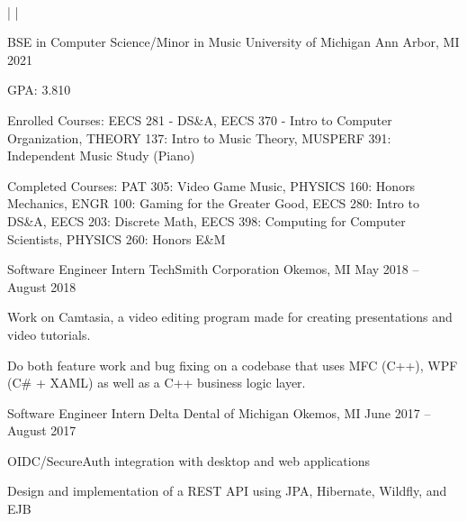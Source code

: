 \documentclass[]{awesome-cv}
\begin{document}
    
\begin{center}
	  \\

	{} | {} | {}
\end{center}
\vspace{-4mm}
\vspace{-2mm}
\cventry
	{BSE in Computer Science/Minor in Music}
	{University of Michigan}
	{Ann Arbor, MI}
	{2021}
	{\begin{cvitems}
		\item{GPA: 3.810}
		\item {Enrolled Courses: EECS 281 - DS\&A, EECS 370 - Intro to Computer Organization, THEORY 137: Intro to Music Theory, MUSPERF 391: Independent Music Study (Piano)}
		\item {Completed Courses: PAT 305: Video Game Music, PHYSICS 160: Honors Mechanics, ENGR 100: Gaming for the Greater Good, EECS 280: Intro to DS\&A, EECS 203: Discrete Math, EECS 398: Computing for Computer Scientists, PHYSICS 260: Honors E\&M}
		\end{cvitems}}

\vspace{-7mm}
\vspace{-3mm}

	\cventry
	{Software Engineer Intern}
	{TechSmith Corporation}
	{Okemos, MI}
	{May 2018 – August 2018}
	{\begin{cvitems}
		\item {Work on Camtasia, a video editing program made for creating presentations and video tutorials.}
		\item {Do both feature work and bug fixing on a codebase that uses MFC (C++), WPF (C\# + XAML) as well as a C++ business logic layer.}
		\end{cvitems}}

	\vspace{-4mm}
	\cventry
	{Software Engineer Intern}
	{Delta Dental of Michigan}
	{Okemos, MI}
	{June 2017 – August 2017}
	{\begin{cvitems}
		\item {OIDC/SecureAuth integration with desktop and web applications}
		\item {Design and implementation of a REST API using JPA, Hibernate, Wildfly, and EJB}
		\end{cvitems}}
\end{document}
